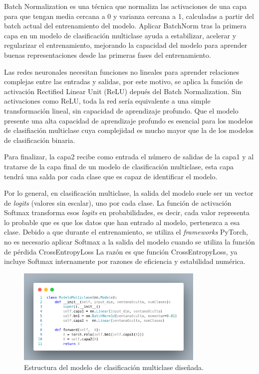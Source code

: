 Batch Normalization es una técnica que normaliza las activaciones de una capa para que tengan media cercana a 0 y varianza cercana a 1, calculadas a partir del batch actual del entrenamiento del modelo. Aplicar BatchNorm tras la primera capa en un modelo de clasificación multiclase ayuda a estabilizar, acelerar y regularizar el entrenamiento, mejorando la capacidad del modelo para aprender buenas representaciones desde las primeras fases del entrenamiento.

Las redes neuronales necesitan funciones no lineales para aprender relaciones complejas entre las entradas y salidas, por este motivo, se aplica la función de activación Rectified Linear Unit (ReLU) depués del Batch Normalization. Sin activaciones como ReLU, toda la red sería equivalente a una simple transformación lineal, sin capacidad de aprendizaje profundo. Que el modelo presente una alta capacidad de aprendizaje profundo es esencial para los modelos de clasifiación multiclase cuya complejidad es mucho mayor que la de los modelos de clasificación binaria.

Para finalizar, la capa2 recibe como entrada el número de salidas de la capa1 y al tratarse de la capa final de un modelo de clasificación multiclase, esta capa tendrá una salda por cada clase que es capaz de identificar el modelo.

Por lo general, en clasificación multiclase, la salida del modelo suele ser un vector de \textit{logits} (valores sin escalar), uno por cada clase. La función de activación Softmax transforma esos \textit{logits} en probabilidades, es decir, cada valor representa lo probable que es que los datos que han entrado al modelo, pertenezca a esa clase. Debido a que durante el entrenamiento, se utiliza el \textit{frameworks} PyTorch, no es necesario aplicar Softmax a la salida del modelo cuando se utiliza la función de pérdida CrossEntropyLoss La razón es que función CrossEntropyLoss, ya incluye Softmax internamente por razones de eficiencia y estabilidad numérica.

\begin{figure}[H]
    \centering
    \includegraphics[width=0.8\textwidth]{./img/modelo/modeloMUL.png}
    \caption{Estructura del modelo de clasificación multiclase diseñada.}
    \label{fig:modMUL}
\end{figure}

